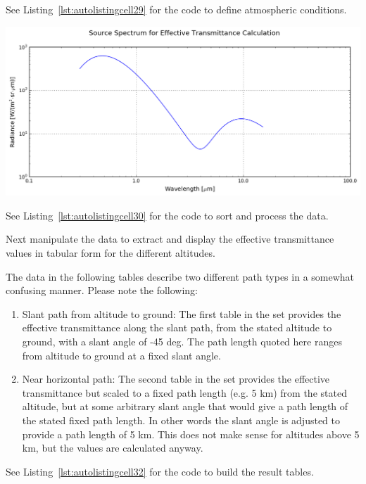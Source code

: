 \documentclass{workpackage}
\begin{document}
See Listing~\ref{lst:autolistingcell29} for the code to define atmospheric conditions.

\begin{center}
\includegraphics{./pic/Analyse-Standard-Atmospheres_29_0.png}
\end{center}



See Listing~\ref{lst:autolistingcell30} for the code to sort and process the data.

Next manipulate the data to extract and display the effective transmittance values in tabular form for the different altitudes.


The data in the following tables describe two different path types in a somewhat confusing manner. Please note the following:


\begin{enumerate}
\item Slant path from altitude to ground: The first table in the set provides the effective transmittance along the slant path, from the stated altitude to ground, with a slant angle of -45 deg.  The path length quoted here ranges from altitude to ground at a fixed slant angle.
\item Near horizontal path: The second table in the set provides the effective transmittance but scaled to a fixed path length (e.g. 5 km) from the stated altitude, but at some arbitrary slant angle that would give a path length of the stated fixed path length.  In other words the slant angle is adjusted to provide a path length of 5 km. This does not make sense for altitudes above 5 km, but the values are calculated anyway.
\end{enumerate}



See Listing~\ref{lst:autolistingcell32} for the code to build the result tables.
\end{document}
